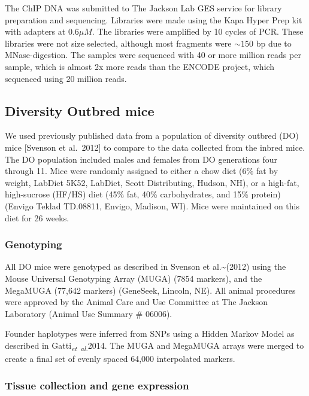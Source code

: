 \documentclass[10pt,letterpaper]{article}
\begin{document}
The ChIP DNA was submitted to The Jackson Lab GES service for library
preparation and sequencing. Libraries were made using the Kapa Hyper
Prep kit with adapters at \(0.6\mu M\). The libraries were amplified by
10 cycles of PCR. These libraries were not size selected, although most
fragments were \(\sim150\) bp due to MNase-digestion. The samples were
sequenced with 40 or more million reads per sample, which is almost 2x
more reads than the ENCODE project, which sequenced using 20 million
reads.

\hypertarget{diversity-outbred-mice}{%
\subsection{Diversity Outbred mice}\label{diversity-outbred-mice}}

We used previously published data from a population of diversity outbred
(DO) mice {[}Svenson et al.~2012{]} to compare to the data collected
from the inbred mice. The DO population included males and females from
DO generations four through 11. Mice were randomly assigned to either a
chow diet (6\% fat by weight, LabDiet 5K52, LabDiet, Scott Distributing,
Hudson, NH), or a high-fat, high-sucrose (HF/HS) diet (45\% fat, 40\%
carbohydrates, and 15\% protein) (Envigo Teklad TD.08811, Envigo,
Madison, WI). Mice were maintained on this diet for 26 weeks.

\hypertarget{genotyping}{%
\subsubsection{Genotyping}\label{genotyping}}

All DO mice were genotyped as described in Svenson et
al.\textasciitilde(2012) using the Mouse Universal Genotyping Array
(MUGA) (7854 markers), and the MegaMUGA (77,642 markers) (GeneSeek,
Lincoln, NE). All animal procedures were approved by the Animal Care and
Use Committee at The Jackson Laboratory (Animal Use Summary \# 06006).

Founder haplotypes were inferred from SNPs using a Hidden Markov Model
as described in Gatti\textsubscript{\textit{et~al.}}2014. The MUGA and
MegaMUGA arrays were merged to create a final set of evenly spaced
64,000 interpolated markers.

\hypertarget{tissue-collection-and-gene-expression}{%
\subsubsection{Tissue collection and gene
expression}\label{tissue-collection-and-gene-expression}}
\end{document}
